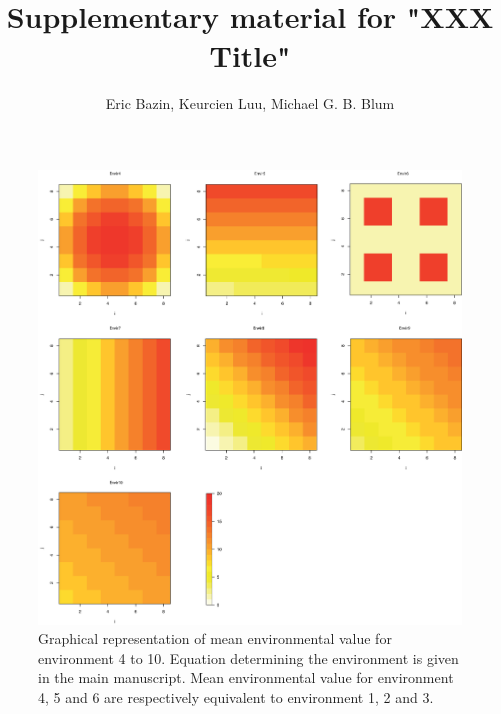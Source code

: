 \documentclass[12pt]{article}
\begin{document}
\title{Supplementary material for "XXX Title"}
\author{Eric Bazin, Keurcien Luu, Michael G. B. Blum}

\maketitle

\begin{figure}[t]
\begin{center}
\includegraphics[height=0.8\textheight]{figures/environmentaldata.eps}
\end{center}
\caption{Graphical representation of mean environmental value for environment 4 to 10. Equation determining the environment is given in the main manuscript. Mean environmental value for environment 4, 5 and 6 are respectively equivalent to environment 1, 2 and 3.}%
\label{fig:simulatedenvir}%
\end{figure}
\end{document}
